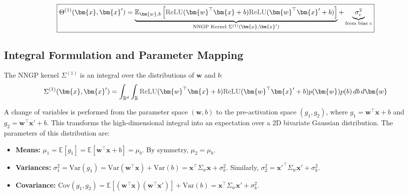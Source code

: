 \documentclass[a4paper]{article}
\newcommand{\ReLU}{\textcolor{relucolor}{\text{ReLU}}}
\DeclareRobustCommand{\ReLU}{\mathrel{\text{%
    \begin{tikzpicture}[baseline=(current bounding box.south)]
        \draw[thick] (0,0) -- (0.25,0) -- (0.4,0.25);
    \end{tikzpicture}}}\!\!}
\theoremstyle{plain}
\theoremstyle{definition}
\theoremstyle{remark}
\begin{document}
\begin{tcolorbox}[colback=blue!10,colframe=blue!80!black,title={\textbf{NTK as Expectation}},enhanced,drop shadow,boxrule=2pt]
\begin{equation}
\label{eq:ntk_expectation}
    \boxed{\Theta^{(1)}(\bm{x}, \bm{x}') = \underbrace{\mathbb{E}_{\bm{w},b} \left[ \ReLU(\bm{w}^\top \bm{x} + b)\ReLU(\bm{w}^\top \bm{x}' + b) \right]}_{\text{NNGP Kernel } \Sigma^{(1)}(\bm{x}, \bm{x}')} + \underbrace{\sigma_c^2}_{\text{from bias } c}}
\end{equation}
\end{tcolorbox}

\subsection{Integral Formulation and Parameter Mapping}
The NNGP kernel $\Sigma^{(1)}$ is an integral over the distributions of $\bm{w}$ and $b$:
\begin{equation}
    \Sigma^{(1)}(\bm{x}, \bm{x}') = \int_{\mathbb{R}^d} \int_{\mathbb{R}} \ReLU(\bm{w}^\top \bm{x} + b)\ReLU(\bm{w}^\top \bm{x}' + b) p(\bm{w})p(b) \,db \,d\bm{w}
\end{equation}

A change of variables is performed from the parameter space $(\bm{w}, b)$ to the pre-activation space $(g_1, g_2)$, where $g_1 = \bm{w}^\top \bm{x} + b$ and $g_2 = \bm{w}^\top \bm{x}' + b$. This transforms the high-dimensional integral into an expectation over a 2D bivariate Gaussian distribution. The parameters of this distribution are:

\begin{tcolorbox}[colback=green!5,colframe=green!80!black,title={\textbf{Remark: Bivariate Gaussian Parameters}},enhanced,drop shadow,boxrule=2pt]
\begin{itemize}
    \item \textbf{Means:} $\mu_1 = \mathbb{E}[g_1] = \mathbb{E}[\bm{w}^\top\bm{x} + b] = \mu_b$. By symmetry, $\mu_2 = \mu_b$.
    \item \textbf{Variances:} $\sigma_1^2 = \text{Var}(g_1) = \text{Var}(\bm{w}^\top\bm{x}) + \text{Var}(b) = \bm{x}^\top \Sigma_w \bm{x} + \sigma_b^2$. Similarly, $\sigma_2^2 = {\bm{x}'}^\top \Sigma_w \bm{x}' + \sigma_b^2$.
    \item \textbf{Covariance:} $\text{Cov}(g_1, g_2) = \mathbb{E}[(\bm{w}^\top\bm{x})(\bm{w}^\top\bm{x}')] + \text{Var}(b) = \bm{x}^\top \Sigma_w \bm{x}' + \sigma_b^2$.
\end{itemize}
\end{tcolorbox}
\end{document}
